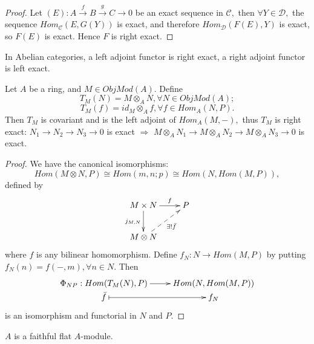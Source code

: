 \begin{proof}
Let $(E): A\stackrel{f}{\rightarrow} B \stackrel{g}{\rightarrow}
C\rightarrow 0$ be an exact sequence in $\mathscr{C},$ then $\forall
Y\in \mathscr{D},$ the sequence $Hom_{\mathscr{C}}(E,G(Y))$ is
exact, and therefore $Hom_{\mathscr{D}}(F(E),Y)$ is exact, so $F(E)$
is exact. Hence $F$ is right exact.
\end{proof}
\begin{remark}
In Abelian categories, a left adjoint functor is right exact, a
right adjoint functor is left exact.
\end{remark}
\begin{prop}
Let $A$ be a ring, and $M\in ObjMod(A).$ Define
$$T_M(N)=M\otimes_A N, \forall N\in ObjMod(A);$$
$$T_M(f)=id_M\otimes_A f, \forall f\in Hom_A(N,P).$$
Then $T_M$ is covariant and is the left adjoint of $Hom_A(M,-),$
thus $T_M$ is right exact: $N_1\rightarrow N_2\rightarrow
N_3\rightarrow 0$ is exact $\Longrightarrow$ $M\otimes_A
N_1\rightarrow M\otimes_A N_2\rightarrow M\otimes_A N_3\rightarrow
0$ is exact.
\end{prop}
\begin{proof}
We have the canonical isomorphisms:
$$Hom(M\otimes N,P)\cong Hom(m,n;p)\cong Hom(N,Hom(M,P)),$$
defined by
\[ \xymatrix{
   M\times N \ar[d]_{j_{M,N}} \ar[r]^-f & P \\
   M\otimes N \ar@{-->}[ur]_-{\exists!\bar{f}} }  \]
where $f$ is any bilinear homomorphism. Define $f_N: N\rightarrow
Hom(M,P)$ by putting $f_N(n)=f(-,m), \forall n\in N.$ Then
\[ \xymatrix@R=0em{
   {\Phi_{NP}: Hom(T_M(N),P)} \ar[r] & {Hom(N,Hom(M,P))} \\
   \bar{f} \ar@{|->}[r] & f_N }  \]
is an isomorphism and functorial in $N$ and $P.$
\end{proof}
\begin{remark}
$A$ is a faithful flat $A$-module.
\end{remark}
